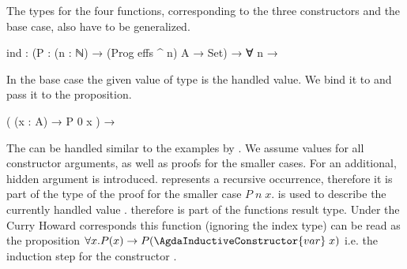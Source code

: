 The types for the four functions, corresponding to the three constructors and
the base case, also have to be generalized.

\begin{code}
ind : (P : (n : ℕ) → (Prog effs ^ n) A → Set) → ∀ n →
\end{code}
In the base case the given value of type  is the handled value.
We bind it to  and pass it to the proposition.
\begin{code}
  (                (x : A)                                        → P 0 x                     )  →
\end{code}
The  can be handled similar to the examples by
\textcite{DBLP:journals/corr/abs-1806-05230}.
We assume values for all constructor arguments, as well as proofs for the
smaller cases.
For  an additional, hidden argument
 is introduced.
 represents a recursive occurrence, therefore it is part of the
type of the proof for the smaller case $P\;n\;x$.
 is used to describe the currently handled value
\AgdaSpace{}.
\AgdaSpace{} therefore is part of
the functions result type.
Under the Curry Howard corresponds this function (ignoring the index type) can
be read as the proposition
$\forall x. P(x) \rightarrow P(\AgdaInductiveConstructor{var}\;x)$
i.e. the induction step for the constructor .

